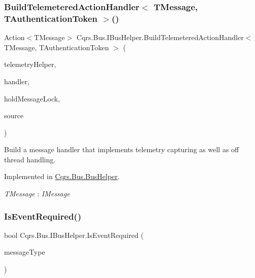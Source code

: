 \subsubsection{\texorpdfstring{Build\+Telemetered\+Action\+Handler$<$ T\+Message, T\+Authentication\+Token $>$()}{BuildTelemeteredActionHandler< TMessage, TAuthenticationToken >()}}
{\footnotesize\ttfamily Action$<$T\+Message$>$ Cqrs.\+Bus.\+I\+Bus\+Helper.\+Build\+Telemetered\+Action\+Handler$<$ T\+Message, T\+Authentication\+Token $>$ (\begin{DoxyParamCaption}\item[{I\+Telemetry\+Helper}]{telemetry\+Helper,  }\item[{Action$<$ T\+Message $>$}]{handler,  }\item[{bool}]{hold\+Message\+Lock,  }\item[{string}]{source }\end{DoxyParamCaption})}



Build a message handler that implements telemetry capturing as well as off thread handling. 



Implemented in \hyperlink{classCqrs_1_1Bus_1_1BusHelper_a7edd5b2ac0d46ce225e592f857f6d525_a7edd5b2ac0d46ce225e592f857f6d525}{Cqrs.\+Bus.\+Bus\+Helper}.

\begin{Desc}
\item[Type Constraints]\begin{description}
\item[{\em T\+Message} : {\em I\+Message}]\end{description}
\end{Desc}
\mbox{\label{interfaceCqrs_1_1Bus_1_1IBusHelper_acddf7635d6de08e3b09d552361fe4fda_acddf7635d6de08e3b09d552361fe4fda}} 
\subsubsection{\texorpdfstring{Is\+Event\+Required()}{IsEventRequired()}\hspace{0.1cm}{\footnotesize\ttfamily [1/2]}}
{\footnotesize\ttfamily bool Cqrs.\+Bus.\+I\+Bus\+Helper.\+Is\+Event\+Required (\begin{DoxyParamCaption}\item[{Type}]{message\+Type }\end{DoxyParamCaption})}



